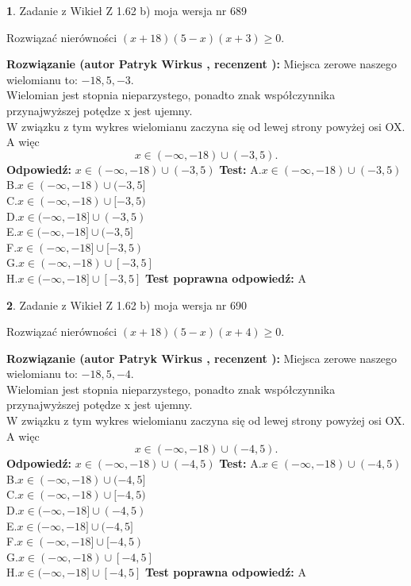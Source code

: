 \documentclass[12pt, a4paper]{article}
\theoremstyle{definition} %
\newtheorem{zad}{}
\newcommand{\zadStart}[1]{\begin{zad}#1\newline}
\newcommand{\zadStop}{\end{zad}}
\newcommand{\rozwStart}[2]{\noindent \textbf{Rozwiązanie (autor #1 , recenzent #2): }\newline}
\newcommand{\rozwStop}{\newline}
\newcommand{\odpStart}{\noindent \textbf{Odpowiedź:}\newline}
\newcommand{\odpStop}{\newline}
\newcommand{\testStart}{\noindent \textbf{Test:}\newline}
\newcommand{\testStop}{\newline}
\newcommand{\kluczStart}{\noindent \textbf{Test poprawna odpowiedź:}\newline}
\newcommand{\kluczStop}{\newline}
\begin{document}
\zadStart{Zadanie z Wikieł Z 1.62 b) moja wersja nr 689}

Rozwiązać nierówności $(x+18)(5-x)(x+3)\ge0$.
\zadStop
\rozwStart{Patryk Wirkus}{}
Miejsca zerowe naszego wielomianu to: $-18, 5, -3$.\\
Wielomian jest stopnia nieparzystego, ponadto znak współczynnika przy\linebreak najwyższej potędze x jest ujemny.\\ W związku z tym wykres wielomianu zaczyna się od lewej strony powyżej osi OX. A więc $$x \in (-\infty,-18) \cup (-3,5).$$
\rozwStop
\odpStart
$x \in (-\infty,-18) \cup (-3,5)$
\odpStop
\testStart
A.$x \in (-\infty,-18) \cup (-3,5)$\\
B.$x \in (-\infty,-18) \cup (-3,5]$\\
C.$x \in (-\infty,-18) \cup [-3,5)$\\
D.$x \in (-\infty,-18] \cup (-3,5)$\\
E.$x \in (-\infty,-18] \cup (-3,5]$\\
F.$x \in (-\infty,-18] \cup [-3,5)$\\
G.$x \in (-\infty,-18) \cup [-3,5]$\\
H.$x \in (-\infty,-18] \cup [-3,5]$
\testStop
\kluczStart
A
\kluczStop



\zadStart{Zadanie z Wikieł Z 1.62 b) moja wersja nr 690}

Rozwiązać nierówności $(x+18)(5-x)(x+4)\ge0$.
\zadStop
\rozwStart{Patryk Wirkus}{}
Miejsca zerowe naszego wielomianu to: $-18, 5, -4$.\\
Wielomian jest stopnia nieparzystego, ponadto znak współczynnika przy\linebreak najwyższej potędze x jest ujemny.\\ W związku z tym wykres wielomianu zaczyna się od lewej strony powyżej osi OX. A więc $$x \in (-\infty,-18) \cup (-4,5).$$
\rozwStop
\odpStart
$x \in (-\infty,-18) \cup (-4,5)$
\odpStop
\testStart
A.$x \in (-\infty,-18) \cup (-4,5)$\\
B.$x \in (-\infty,-18) \cup (-4,5]$\\
C.$x \in (-\infty,-18) \cup [-4,5)$\\
D.$x \in (-\infty,-18] \cup (-4,5)$\\
E.$x \in (-\infty,-18] \cup (-4,5]$\\
F.$x \in (-\infty,-18] \cup [-4,5)$\\
G.$x \in (-\infty,-18) \cup [-4,5]$\\
H.$x \in (-\infty,-18] \cup [-4,5]$
\testStop
\kluczStart
A
\kluczStop
\end{document}
